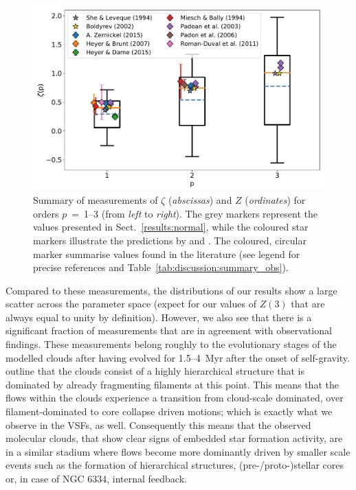 \begin{figure}
	\includegraphics[width=\textwidth]{compare_observations.pdf}
	\caption{Summary of measurements of $\zeta$ (\textit{abscissas}) and $Z$ (\textit{ordinates}) for orders $p$~=~1--3 (from \textit{left} to \textit{right}). The grey markers represent the values presented in Sect.~\ref{results:normal}, while the coloured star markers illustrate the predictions by \citet{She1994} and \citet{Boldyrev2002}. The coloured, circular marker summarise values found in the literature (see legend for precise references and Table~\ref{tab:discussion:summary_obs}). 
	}
	\label{pic:discussion:comp_observation}
\end{figure}


Compared to these measurements, the distributions of our results show a large scatter across the parameter space (expect for our values of $Z(3)$ that are always equal to unity by definition). 
However, we also see that there is a significant fraction of measurements that are in agreement with observational findings. 
These measurements belong roughly to the evolutionary stages of the modelled clouds after having evolved for 1.5--4~Myr after the onset of self-gravity.
 outline that the clouds consist of a highly hierarchical structure that is dominated by already fragmenting filaments at this point.
This means that the flows within the clouds experience a transition from cloud-scale dominated, over filament-dominated to core collapse driven motions; which is exactly what we observe in the VSFs, as well.
Consequently this means that the observed molecular clouds, that show clear signs of embedded star formation activity, are in a similar stadium where flows become more dominantly driven by smaller scale events such as the formation of hierarchical structures, (pre-/proto-)stellar cores or, in case of NGC 6334, internal feedback.

